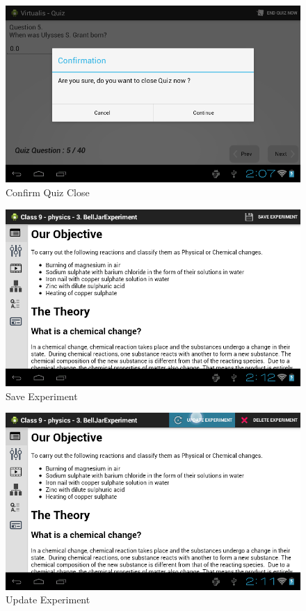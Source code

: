 \documentclass[12pt]{report}
\begin{document}
\begin{figure}[H]
 \centering
 \includegraphics[width=15cm]{./33.png}
 \caption{Confirm Quiz Close\label{fig:33}}
\end{figure}


\begin{figure}[H]
 \centering
 \includegraphics[width=15cm]{./37.png}
 \caption{Save Experiment\label{fig:37}}
\end{figure}

\begin{figure}[H]
 \centering
 \includegraphics[width=15cm]{./34.png}
 \caption{Update Experiment \label{fig:34}}
\end{figure}
\end{document}
